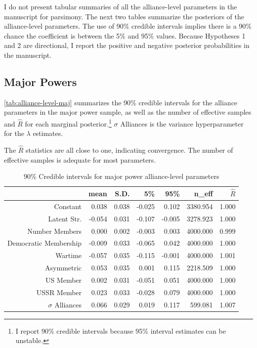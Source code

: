 \documentclass[12pt]{article}
\begin{document}
I do not present tabular summaries of all the alliance-level parameters in the manuscript for parsimony. The next two tables summarize the posteriors of the alliance-level parameters. The use of 90\% credible intervals implies there is a 90\% chance the coefficient is between the 5\% and 95\% values. Because Hypotheses 1 and 2 are directional, I report the positive and negative posterior probabilities in the manuscript.  

\subsection{Major Powers}


\autoref{tab:alliance-level-maj} summarizes the 90\% credible intervals for the alliance parameters in the major power sample, as well as the number of effective samples and $\hat{R}$ for each marginal posterior.\footnote{I report 90\% credible intervals because 95\% interval estimates can be unstable.} $\sigma$ Alliances is the variance hyperparameter for the $\lambda$ estimates. 

The $\hat{R}$ statistics are all close to one, indicating convergence. The number of effective samples is adequate for most parameters. 


\begin{table}[ht]
\centering
\begin{tabular}{rrrrrrr}
  \hline
 & mean & S.D. & 5\% & 95\% & n\_eff & $\hat{R}$ \\ 
  \hline
Constant & 0.038 & 0.038 & -0.025 & 0.102 & 3380.954 & 1.000 \\ 
  Latent Str. & -0.054 & 0.031 & -0.107 & -0.005 & 3278.923 & 1.000 \\ 
  Number Members & 0.000 & 0.002 & -0.003 & 0.003 & 4000.000 & 0.999 \\ 
  Democratic Membership & -0.009 & 0.033 & -0.065 & 0.042 & 4000.000 & 1.000 \\ 
  Wartime & -0.057 & 0.035 & -0.115 & -0.001 & 4000.000 & 1.001 \\ 
  Asymmetric & 0.053 & 0.035 & 0.001 & 0.115 & 2218.509 & 1.000 \\ 
  US Member & 0.002 & 0.031 & -0.051 & 0.051 & 4000.000 & 1.000 \\ 
  USSR Member & 0.023 & 0.033 & -0.028 & 0.079 & 4000.000 & 1.000 \\ 
  $\sigma$ Alliances & 0.066 & 0.029 & 0.019 & 0.117 & 599.081 & 1.007 \\ 
   \hline
\end{tabular}
\caption{90\% Credible intervals for major power alliance-level parameters}
\label{tab:alliance-level-maj}
\end{table}
\end{document}
